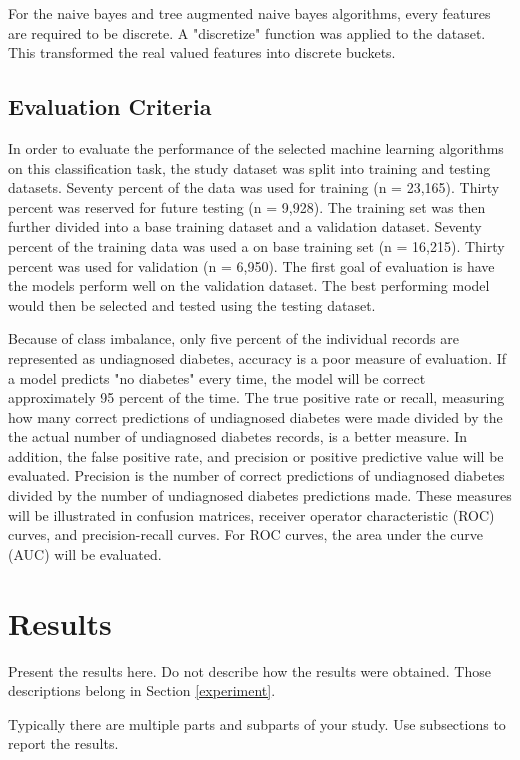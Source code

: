 \documentclass[twoside,11pt]{article}
\begin{document}
For the naive bayes and tree augmented naive bayes algorithms, every features are required to be discrete. A "discretize" function was applied to the dataset. This transformed the real valued features into discrete buckets. 

\subsection{Evaluation Criteria}
In order to evaluate the performance of the selected machine learning algorithms on this classification task, the study dataset was split into training and testing datasets. Seventy percent of the data was used for training (n = 23,165). Thirty percent was reserved for future testing (n = 9,928). The training set was then further divided into a base training dataset and a validation dataset. Seventy percent of the training data was used a on base training set (n = 16,215). Thirty percent was used for validation (n = 6,950). The first goal of evaluation is have the models perform well on the validation dataset. The best performing model would then be selected and tested using the testing dataset. 

Because of class imbalance, only five percent of the individual records are represented as undiagnosed diabetes, accuracy is a poor measure of evaluation. If a model predicts "no diabetes" every time, the model will be correct approximately 95 percent of the time. The true positive rate or recall, measuring how many correct predictions of undiagnosed diabetes were made divided by the the actual number of undiagnosed diabetes records, is a better measure. In addition, the false positive rate, and precision or positive predictive value will be evaluated. Precision is the number of correct predictions of undiagnosed diabetes divided by the number of undiagnosed diabetes predictions made. These measures will be illustrated in confusion matrices, receiver operator characteristic (ROC) curves, and precision-recall curves. For ROC curves, the area under the curve (AUC) will be evaluated. 

\section{Results} \label{results}

Present the results here.
Do not describe how the results were obtained.
Those descriptions belong in Section \ref{experiment}.

Typically there are multiple parts and subparts of your study.
Use subsections to report the results.
\end{document}
